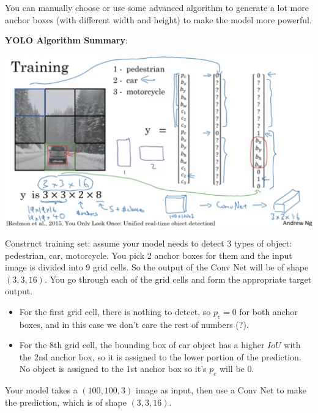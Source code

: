 \documentclass{article}
\begin{document}
\bigskip

\noindent You can manually choose or use some advanced algorithm to generate a lot more anchor boxes (with different width and height) to make the model more powerful.

\bigskip

\noindent \textbf{YOLO Algorithm Summary}:

\begin{center}
\includegraphics[scale=0.3]{./images/yolo_train.png}
\end{center}

\noindent Construct training set: assume your model needs to detect 3 types of object: pedestrian, car, motorcycle. You pick 2 anchor boxes for them and the input image is divided into 9 grid cells. So the output of the Conv Net will be of shape \((3, 3, 16)\). You go through each of the grid cells and form the appropriate target output.

\begin{itemize}
    \item For the first grid cell, there is nothing to detect, so \(p_{c} = 0\) for both anchor boxes, and in this case we don't care the rest of numbers (?).
    \item For the 8th grid cell, the bounding box of car object has a higher \(IoU\) with the 2nd anchor box, so it is assigned to the lower portion of the prediction. No object is assigned to the 1st anchor box so it's \(p_{c}\) will be 0.
\end{itemize}

\noindent Your model takes a \((100, 100, 3)\) image as input, then use a Conv Net to make the prediction, which is of shape \((3, 3, 16)\).
\end{document}
